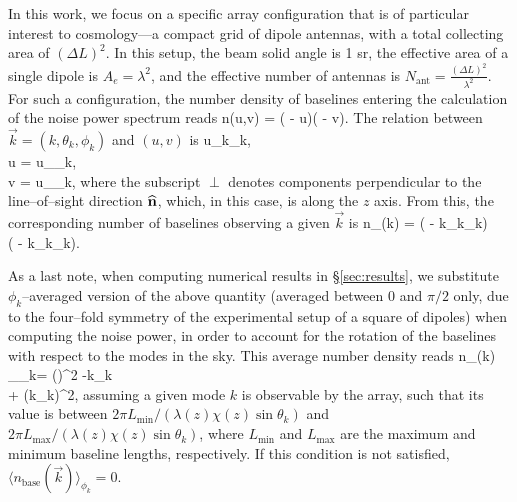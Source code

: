 In this work, we focus on a specific array configuration that is of particular interest to cosmology---a compact grid of dipole antennas, with a total collecting area of $(\Delta L)^2$. In this setup, the beam solid angle is 1 sr, the effective area of a single dipole is $A_e = \lambda^2$, and the effective number of antennas is $N_\text{ant} = \frac{(\Delta L)^2}{\lambda^2}$. For such a configuration, the number density of baselines entering the calculation of the noise power spectrum reads
\beq
n(u,v) = ( - u)( - v).
\label{eq:nuv_fftt}
\eeq
The relation between $\vec k=(k,\theta_k,\phi_k)$ and $(u,v)$ is
\beq
\bga
u_\perp \equiv {}k\sin\theta_k,\\
u = u_\perp \cos\phi_k,\\
v = u_\perp \sin\phi_k,
\ega
\label{eq:k_uv}
\eeq
where the subscript $\perp$ denotes components perpendicular to the line--of--sight direction ${\bf{\widehat n}}$, which, in this case, is along the $z$ axis. From this, the corresponding number of baselines observing a given $\vec k$ is
\beq
\bga
n_(\vec k) = ( - k\sin\theta_k\cos\phi_k)\\\times ( - k\sin\theta_k\sin\phi_k).
\ega
\label{eq:nk_fftt}
\eeq

As a last note, when computing numerical results in \S\ref{sec:results}, we substitute $\phi_k$--averaged version of the above quantity (averaged between $0$ and $\pi/2$ only, due to the four--fold symmetry of the experimental setup of a square of dipoles) when computing the noise power, in order to account for the rotation of the baselines with respect to the modes in the sky. This average number density reads
\beq
\bga
\langle n_(\vec k) \rangle_{\phi_k}= \left(\right)^2 -k\sin\theta_k \\+ \left(k\sin\theta_k\right)^2,
\ega
\label{eq:nk_fftt_mean}
\eeq
assuming a given mode $k$ is observable by the array, such that its value is between $2\pi L_\text{min}/(\lambda(z)\chi(z)\sin\theta_k)$ and $2\pi L_\text{max}/(\lambda(z)\chi(z)\sin\theta_k)$, where $L_\text{min}$ and $L_\text{max}$ are the maximum and minimum baseline lengths, respectively. If this condition is not satisfied, $\langle n_\text{base}(\vec k) \rangle_{\phi_k}=0$.